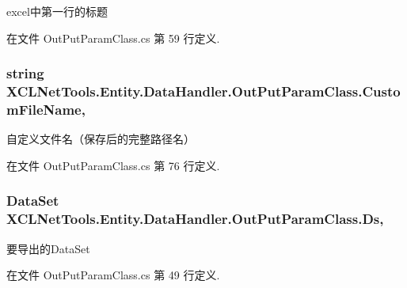 excel中第一行的标题 



在文件 Out\-Put\-Param\-Class.\-cs 第 59 行定义.

\hypertarget{class_x_c_l_net_tools_1_1_entity_1_1_data_handler_1_1_out_put_param_class_a44cec19f205a53ac8bd2889bc5393cf3}{
\subsubsection[{Custom\-File\-Name}]{\setlength{\rightskip}{0pt plus 5cm}string X\-C\-L\-Net\-Tools.\-Entity.\-Data\-Handler.\-Out\-Put\-Param\-Class.\-Custom\-File\-Name\hspace{0.3cm}{\ttfamily [get]}, {\ttfamily [set]}}}\label{class_x_c_l_net_tools_1_1_entity_1_1_data_handler_1_1_out_put_param_class_a44cec19f205a53ac8bd2889bc5393cf3}


自定义文件名（保存后的完整路径名） 



在文件 Out\-Put\-Param\-Class.\-cs 第 76 行定义.

\hypertarget{class_x_c_l_net_tools_1_1_entity_1_1_data_handler_1_1_out_put_param_class_a7cf4ee80913a37cdbfa871bc47069114}{
\subsubsection[{Ds}]{\setlength{\rightskip}{0pt plus 5cm}Data\-Set X\-C\-L\-Net\-Tools.\-Entity.\-Data\-Handler.\-Out\-Put\-Param\-Class.\-Ds\hspace{0.3cm}{\ttfamily [get]}, {\ttfamily [set]}}}\label{class_x_c_l_net_tools_1_1_entity_1_1_data_handler_1_1_out_put_param_class_a7cf4ee80913a37cdbfa871bc47069114}


要导出的\-Data\-Set 



在文件 Out\-Put\-Param\-Class.\-cs 第 49 行定义.

